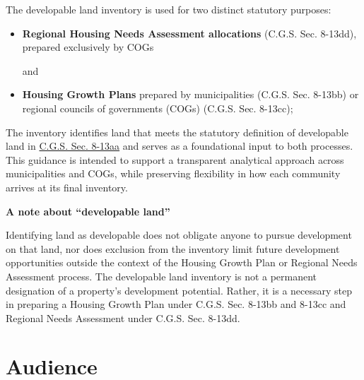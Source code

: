 \documentclass[
  letterpaper,
  DIV=11,
  numbers=noendperiod]{scrreprt}
\begin{document}
The developable land inventory is used for two distinct statutory
purposes:

\begin{itemize}
\item
  \textbf{Regional Housing Needs Assessment allocations} (C.G.S. Sec.
  8-13dd), prepared exclusively by COGs

  and
\item
  \textbf{Housing Growth Plans} prepared by municipalities (C.G.S. Sec.
  8-13bb) or regional councils of governments (COGs) (C.G.S. Sec.
  8-13cc);
\end{itemize}

The inventory identifies land that meets the statutory definition of
developable land in
\href{https://cga.ct.gov/2026/sup/chap_124b.htm\#sec_8-13aa}{C.G.S. Sec.
8-13aa} and serves as a foundational input to both processes. This
guidance is intended to support a transparent analytical approach across
municipalities and COGs, while preserving flexibility in how each
community arrives at its final inventory.

\begin{tcolorbox}[enhanced jigsaw, arc=.35mm, bottomrule=.15mm, breakable, colback=white, colframe=quarto-callout-warning-color-frame, left=2mm, leftrule=.75mm, opacityback=0, rightrule=.15mm, toprule=.15mm]
\begin{minipage}[t]{5.5mm}
\textcolor{quarto-callout-warning-color}{\faExclamationTriangle}
\end{minipage}%
\begin{minipage}[t]{\textwidth - 5.5mm}

\vspace{-3mm}\textbf{A note about ``developable land''}\vspace{3mm}

Identifying land as developable does not obligate anyone to pursue
development on that land, nor does exclusion from the inventory limit
future development opportunities outside the context of the Housing
Growth Plan or Regional Needs Assessment process. The developable land
inventory is not a permanent designation of a property's development
potential. Rather, it is a necessary step in preparing a Housing Growth
Plan under C.G.S. Sec. 8-13bb and 8-13cc and Regional Needs Assessment
under C.G.S. Sec. 8-13dd.

\end{minipage}%
\end{tcolorbox}

\section{Audience}\label{audience}
\end{document}
